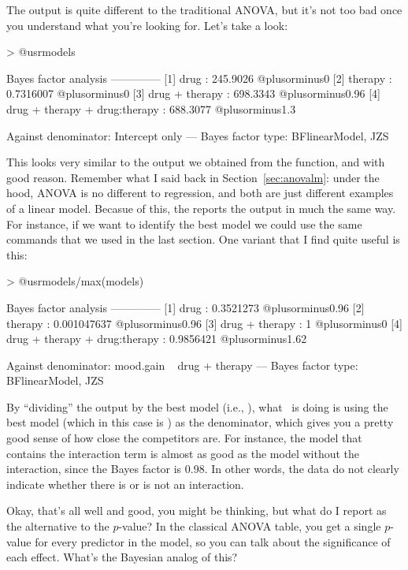 \noindent
The output is quite different to the traditional ANOVA, but it's not too bad once you understand what you're looking for. Let's take a look:
\begin{rblock1}
> @usr{models}

Bayes factor analysis
--------------
[1] drug                          : 245.9026  @plusorminus0%
[2] therapy                       : 0.7316007 @plusorminus0%
[3] drug + therapy                : 698.3343  @plusorminus0.96%
[4] drug + therapy + drug:therapy : 688.3077  @plusorminus1.3%

Against denominator:
  Intercept only 
---
Bayes factor type: BFlinearModel, JZS
\end{rblock1}

\noindent
This looks very similar to the output we obtained from the  function, and with good reason. Remember what I said back in Section~\ref{sec:anovalm}: under the hood, ANOVA is no different to regression, and both are just different examples of a linear model. Becasue of this, the   reports the output in much the same way. For instance, if we want to identify the best model we could use the same commands that we used in the last section. One variant that I find quite useful is this:

\begin{rblock1}
> @usr{models/max(models)}

Bayes factor analysis
--------------
[1] drug                          : 0.3521273   @plusorminus0.96%
[2] therapy                       : 0.001047637 @plusorminus0.96%
[3] drug + therapy                : 1           @plusorminus0%
[4] drug + therapy + drug:therapy : 0.9856421   @plusorminus1.62%

Against denominator:
  mood.gain ~ drug + therapy 
---
Bayes factor type: BFlinearModel, JZS
\end{rblock1}
By ``dividing'' the  output by the best model (i.e., ), what \R\ is doing is using the best model (which in this case is ) as the denominator, which gives you a pretty good sense of how close the competitors are. For instance, the model that contains the interaction term is almost as good as the model without the interaction, since the Bayes factor is 0.98. In other words, the data do not clearly indicate whether there is or is not an interaction.  


Okay, that's all well and good, you might be thinking, but what do I report as the alternative to the $p$-value? In the classical ANOVA table, you get a single $p$-value for every predictor in the model, so you can talk about the significance of each effect. What's the Bayesian analog of this?

